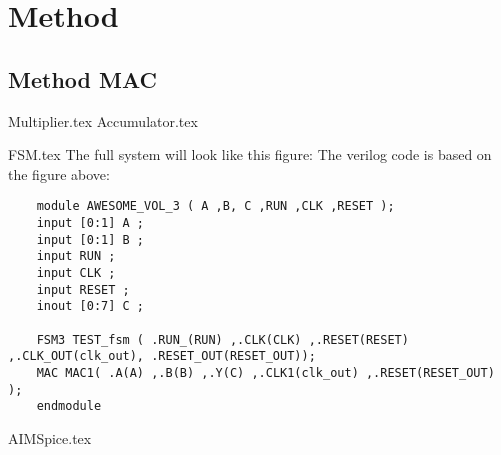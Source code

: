 \section{Method}
\subsection{Method MAC} 
{Multiplier.tex}
{Accumulator.tex}


{FSM.tex}
The full system will look like this figure: 
The verilog code is based on the figure above: 
\begin{lstlisting}
    module AWESOME_VOL_3 ( A ,B, C ,RUN ,CLK ,RESET );	
    input [0:1] A ;
    input [0:1] B ;
    input RUN ;
    input CLK ;
    input RESET ;
    inout [0:7] C ; 
    
    FSM3 TEST_fsm ( .RUN_(RUN) ,.CLK(CLK) ,.RESET(RESET) ,.CLK_OUT(clk_out), .RESET_OUT(RESET_OUT));
    MAC MAC1( .A(A) ,.B(B) ,.Y(C) ,.CLK1(clk_out) ,.RESET(RESET_OUT) );   
    endmodule
\end{lstlisting}

{AIMSpice.tex}


